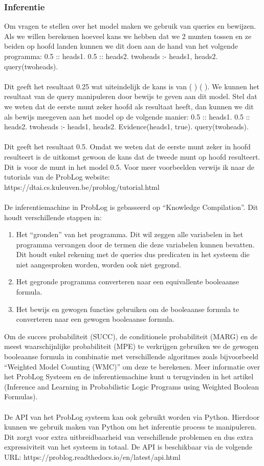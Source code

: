\documentclass[12pt,a4paper,oneside]{book}
\theoremstyle{definition}
\begin{document}
\subsubsection{Inferentie}
Om vragen te stellen over het model maken we gebruik van queries en bewijzen. Als we willen berekenen hoeveel kans we hebben dat we 2 munten tossen en ze beiden op hoofd landen kunnen we dit doen aan de hand van het volgende programma:
0.5 :: heads1.
0.5 :: heads2.
two\textunderscore heads :- heads1, heads2.
query(two\textunderscore heads).
\\\\
Dit geeft het resultaat 0.25 wat uiteindelijk de kans is van ( ) ( ).
We kunnen het resultaat van de query manipuleren door bewijs te geven aan dit model. Stel dat we weten dat de eerste munt zeker hoofd als resultaat heeft, dan kunnen we dit als bewijs meegeven aan het model op de volgende manier:
0.5 :: heads1.
0.5 :: heads2.
two\textunderscore heads :- heads1, heads2.
Evidence(heads1, true).
query(two\textunderscore heads).
\\\\
Dit geeft het resultaat 0.5. Omdat we weten dat de eerste munt zeker in hoofd resulteert is de uitkomst gewoon de kans dat de tweede munt op hoofd resulteert. Dit is voor de munt in het model 0.5. Voor meer voorbeelden verwijs ik naar de tutorials van de ProbLog website: https://dtai.cs.kuleuven.be/problog/tutorial.html
\\\\
De inferentiemachine in ProbLog is gebasseerd op “Knowledge Compilation”. Dit houdt verschillende stappen in:
\begin{enumerate}
	\item Het “gronden” van het programma. Dit wil zeggen alle variabelen in het programma vervangen door de termen die deze variabelen kunnen bevatten. Dit houdt enkel rekening met de queries dus predicaten in het systeem die niet aangesproken worden, worden ook niet gegrond.
	\item Het gegronde programma converteren naar een equivallente booleaanse formula.
	\item Het bewijs en gewogen functies gebruiken om de booleaanse formula te converteren naar een gewogen booleaanse formula.
\end{enumerate}
Om de succes probabiliteit (SUCC), de conditionele probabiliteit (MARG) en de meest waarschijnlijke probabiliteit (MPE) te verkrijgen gebruiken we de gewogen booleaanse formula in combinatie met verschillende algoritmes zoals bijvoorbeeld “Weighted Model Counting (WMC)” om deze te berekenen. Meer informatie over het ProbLog Systeem en de inferentiemachine kunt u terugvinden in het artikel (Inference and Learning in Probabilistic Logic Programs using Weighted Boolean Formulas).
\\\\
De API van het ProbLog systeem kan ook gebruikt worden via Python. Hierdoor kunnen we gebruik maken van Python om het inferentie process te manipuleren. Dit zorgt voor extra uitbreidbaarheid van verschillende problemen en dus extra expressiviteit van het systeem in totaal. De API is beschikbaar via de volgende URL: https://problog.readthedocs.io/en/latest/api.html
\end{document}

